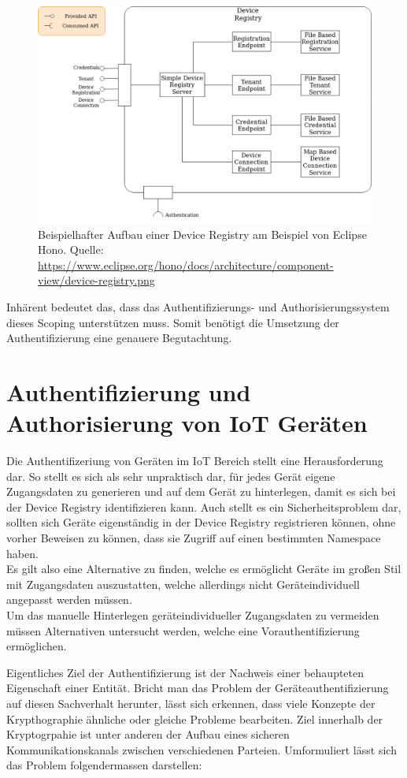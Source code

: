 \begin{figure}
    \centering
    \includegraphics[width=0.75\linewidth]{img/device-registry.png}
    \caption[Bestandteile einer Device Registry]{Beispielhafter Aufbau einer Device Registry am Beispiel von Eclipse Hono. Quelle: \url{https://www.eclipse.org/hono/docs/architecture/component-view/device-registry.png}}
    \label{fig:device_registry}
\end{figure}

Inhärent bedeutet das, dass das Authentifizierungs- und Authorisierungssystem dieses Scoping unterstützen muss. Somit benötigt die Umsetzung der Authentifizierung eine genauere Begutachtung.

\section{Authentifizierung und Authorisierung von IoT Geräten}
\label{sec:auth}

Die Authentifizeriung von Geräten im IoT Bereich stellt eine Herausforderung dar. So stellt es sich als sehr unpraktisch dar, für jedes Gerät eigene Zugangsdaten zu generieren und auf dem Gerät zu hinterlegen, damit es sich bei der Device Registry identifizieren kann. Auch stellt es ein Sicherheitsproblem dar, sollten sich Geräte eigenständig in der Device Registry registrieren können, ohne vorher Beweisen zu können, dass sie Zugriff auf einen bestimmten Namespace haben. \\
Es gilt also eine Alternative zu finden, welche es ermöglicht Geräte im großen Stil mit Zugangsdaten auszustatten, welche allerdings nicht Geräteindividuell angepasst werden müssen.\\
Um das manuelle Hinterlegen geräteindividueller Zugangsdaten zu vermeiden müssen Alternativen untersucht werden, welche eine Vorauthentifizierung ermöglichen. 

Eigentliches Ziel der Authentifizierung ist der Nachweis einer behaupteten Eigenschaft einer Entität. Bricht man das Problem der Geräteauthentifizierung auf diesen Sachverhalt herunter, lässt sich erkennen, dass viele Konzepte der Krypthographie ähnliche oder gleiche Probleme bearbeiten. Ziel innerhalb der Kryptogrpahie ist unter anderen der Aufbau eines sicheren Kommunikationskanals zwischen verschiedenen Parteien. Umformuliert lässt sich das Problem folgendermassen darstellen:

